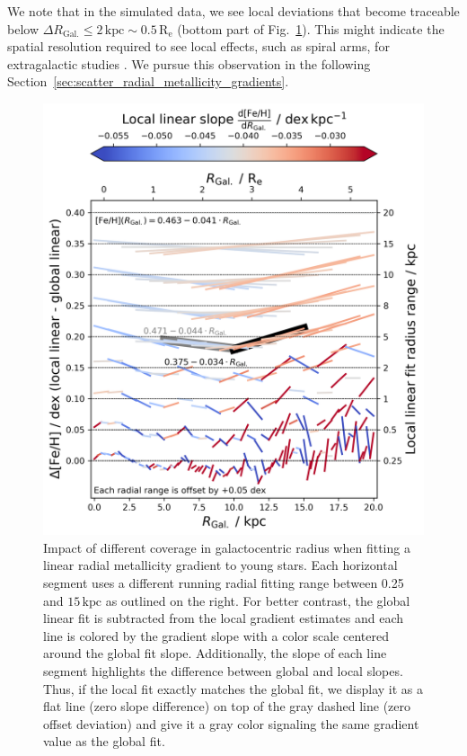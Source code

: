 \documentclass[twocolumn,apj,numberedappendix,appendixfloats]{openjournal}
\begin{document}
\begin{CJK*}{UTF8}{gbsn}
We note that in the simulated data, we see local deviations that become traceable below $\Delta R_\mathrm{Gal.} \leq 2\,\mathrm{kpc} \sim 0.5\,\mathrm{R_e}$ (bottom part of Fig.~\ref{fig:radial_range_impact}). This might indicate the spatial resolution required to see local effects, such as spiral arms, for extragalactic studies \citep[see also][]{Krumholz2018b, Li2024b}. We pursue this observation in the following Section~\ref{sec:scatter_radial_metallicity_gradients}.

\begin{figure}
    \centering
    \includegraphics[width=\columnwidth]{figures/radial_range_impact.png}
    \caption{Impact of different coverage in galactocentric radius when fitting a linear radial metallicity gradient to young stars. Each horizontal segment uses a different running radial fitting range between 0.25 and $15\,\mathrm{kpc}$ as outlined on the right. For better contrast, the global linear fit is subtracted from the local gradient estimates and each line is colored by the gradient slope with a color scale centered around the global fit slope. Additionally, the slope of each line segment highlights the difference between global and local slopes. Thus, if the local fit exactly matches the global fit, we display it as a flat line (zero slope difference) on top of the gray dashed line (zero offset deviation) and give it a gray color signaling the same gradient value as the global fit.}
    \label{fig:radial_range_impact}
\end{figure}


\end{CJK*}
\end{document}
